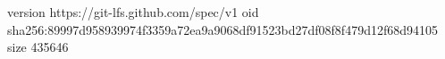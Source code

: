 version https://git-lfs.github.com/spec/v1
oid sha256:89997d958939974f3359a72ea9a9068df91523bd27df08f8f479d12f68d94105
size 435646
